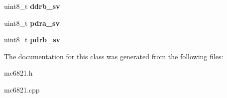 \begin{DoxyCompactItemize}
\item 
\hypertarget{classMC6821_a4d2ff521e77c816523f5a49d11a016bc}{uint8\-\_\-t {\bfseries ddrb\-\_\-sv}}\label{classMC6821_a4d2ff521e77c816523f5a49d11a016bc}

\item 
\hypertarget{classMC6821_ac85538eaa73e200b018baa5a12f5925e}{uint8\-\_\-t {\bfseries pdra\-\_\-sv}}\label{classMC6821_ac85538eaa73e200b018baa5a12f5925e}

\item 
\hypertarget{classMC6821_a3c588f5962575cb9ea95995aa770b7e3}{uint8\-\_\-t {\bfseries pdrb\-\_\-sv}}\label{classMC6821_a3c588f5962575cb9ea95995aa770b7e3}

\end{DoxyCompactItemize}


The documentation for this class was generated from the following files\-:\begin{DoxyCompactItemize}
\item 
mc6821.\-h\item 
mc6821.\-cpp\end{DoxyCompactItemize}
